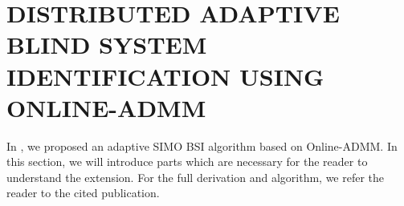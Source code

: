 \documentclass{article}
\begin{document}



\section{DISTRIBUTED ADAPTIVE BLIND SYSTEM IDENTIFICATION USING ONLINE-ADMM}
\label{sec:dbsi}
In \cite{blochbergerDBSI}, we proposed an adaptive SIMO BSI algorithm based on Online-ADMM.
In this section, we will introduce parts which are necessary for the reader to understand the extension.
For the full derivation and algorithm, we refer the reader to the cited publication.
\end{document}
